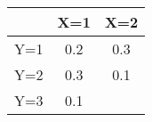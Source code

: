 \begin{tabular}[12pt]{|c|c|c}
\hline
& X=1 & X=2 \\ \hline
Y=1 & 0.2 & 0.3 \\ \hline
Y=2 & 0.3 & 0.1 \\  \hline
Y=3 & 0.1 & \\
\end{tabular}